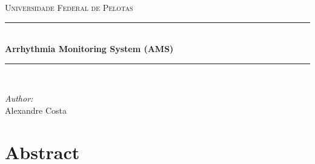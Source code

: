 \documentclass[12pt]{article} %
\begin{document}

\begin{titlepage}

\newcommand{\HRule}{\rule{\linewidth}{0.5mm}} %

\center %

\textsc{\LARGE Universidade Federal de Pelotas}\\[1.5cm] %

\HRule \\[0.4cm]
{ \huge \bfseries Arrhythmia Monitoring System (AMS)}\\[0.4cm] %
\HRule \\[1.5cm]

\begin{minipage}{0.4\textwidth}
\begin{flushleft} \large
\emph{Author:}\\
Alexandre Costa %
\end{flushleft}
\end{minipage}

\vfill %

\end{titlepage}


\tableofcontents %

\newpage %


\section{Abstract} %
\end{document}
